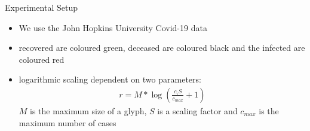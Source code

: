 \documentclass{beamer}
\begin{document}
  \begin{frame}{Experimental Setup}
	\begin{itemize}
		\item We use the John Hopkins University Covid-19 data
		\item recovered are coloured green, deceased are coloured black and		the infected are coloured red
		\item logarithmic scaling dependent on two parameters:
		\begin{align*}
			r=M* \log \left( \frac{c_i S}{c_{max}} +1 \right)
		\end{align*}
		$M$ is the maximum size of a glyph, $S$ is a scaling factor and $c_{max}$ is			the maximum number of cases
	\end{itemize}
\end{frame}
\end{document}
